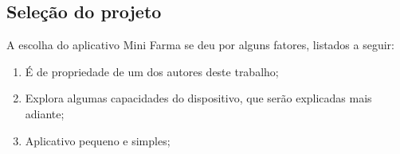 \subsection{Seleção do projeto} \label{subsec:selecaodoprojeto}

A escolha do aplicativo Mini Farma se deu por alguns fatores, listados a seguir:

\begin{enumerate}
    \item É de propriedade de um dos autores deste trabalho;
    \item Explora algumas capacidades do dispositivo, que serão explicadas mais adiante;
    \item Aplicativo pequeno e simples;
\end{enumerate}
 